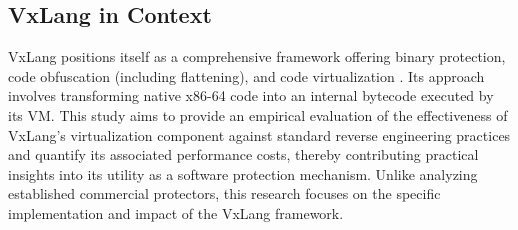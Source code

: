 \subsection{VxLang in Context}
VxLang positions itself as a comprehensive framework offering binary protection, code obfuscation (including flattening), and code virtualization \cite{VxLang}. Its approach involves transforming native x86-64 code into an internal bytecode executed by its VM. This study aims to provide an empirical evaluation of the effectiveness of VxLang's virtualization component against standard reverse engineering practices and quantify its associated performance costs, thereby contributing practical insights into its utility as a software protection mechanism. Unlike analyzing established commercial protectors, this research focuses on the specific implementation and impact of the VxLang framework.
